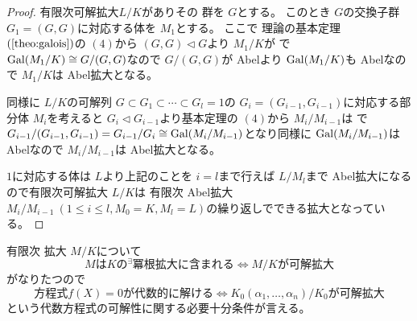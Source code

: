 \documentclass[../master_galois_theory]{subfiles}
\begin{document}
\begin{proof}
  有限次可解拡大$L/K$がありその \galois 群を $G$とする。
  このとき $G$の交換子群 $G_1 = (G,G)$に対応する体を $M_1$とする。
  ここで \galois 理論の基本定理 $(\mathrm{\ref{theo:galois}})$の $(4)$から
  $(G,G) \lhd G$より $M_1/K$が \galois で $\mathrm{Gal}(M_1/K) \cong G/(G,G)$なので
  $G/(G,G)$が \rm{Abel}より $\mathrm{Gal}(M_1/K)$も \rm{Abel}なので $M_1/K$は \rm{Abel}拡大となる。

  同様に $L/K$の可解列 $G \subset G_1 \subset \cdots \subset G_l = 1$の
  $G_i = (G_{i-1},G_{i-1})$に対応する部分体 $M_i$を考えると $G_i \lhd G_{i-1}$より基本定理の $(4)$から
  $M_i/M_{i-1}$は \galois で
  $G_{i-1}/(G_{i-1},G_{i-1}) = G_{i-1}/G_i \cong \mathrm{Gal}(M_i/M_{i-1})$となり同様に $\mathrm{Gal}(M_i/M_{i-1})$は \rm{Abel}なので $M_i/M_{i-1}$は \rm{Abel}拡大となる。

  $1$に対応する体は $L$より上記のことを $i = l$まで行えば $L/M_l$まで \rm{Abel}拡大になるので有限次可解拡大 $L/K$は 有限次 \rm{Abel}拡大 $M_i/M_{i-1} \  (1 \leq i \leq l , M_0 = K , M_l = L)$の繰り返しでできる拡大となっている。
\end{proof}

\begin{theo}
  有限次 \galois 拡大 $M/K$について
  \[
  MはKの {}^\exists 冪根拡大に含まれる \Leftrightarrow M/Kが可解拡大
  \]
  がなりたつので
  \[
  方程式 f(X) = 0が代数的に解ける \Leftrightarrow K_0(\alpha_1 , \dots , \alpha_n) / K_0が可解拡大
  \]
  という代数方程式の可解性に関する必要十分条件が言える。
\end{theo}

\clearpage
\end{document}
